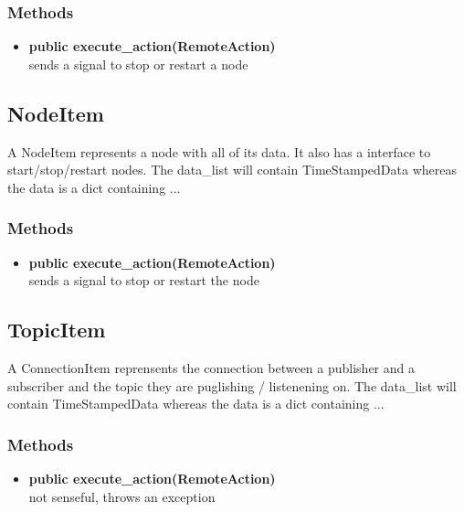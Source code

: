 \subsubsection{Methods}
\begin{itemize}
  \item \textbf{public execute\_action(RemoteAction)}\\
  sends a signal to stop or restart a node
\end{itemize}

\subsection{NodeItem}
 A NodeItem represents a node with all of its data. It also has a interface to start/stop/restart nodes.
 The data\_list will contain TimeStampedData whereas the data is a dict containing ...
\subsubsection{Methods}
\begin{itemize}
  \item \textbf{public execute\_action(RemoteAction)}\\
  sends a signal to stop or restart the node
\end{itemize}

\subsection{TopicItem}
A ConnectionItem reprensents the connection between a publisher and a subscriber and the topic they are puglishing / listenening on.
The data\_list will contain TimeStampedData whereas the data is a dict containing ...
\subsubsection{Methods}
\begin{itemize}
  \item \textbf{public execute\_action(RemoteAction)}\\ 
  not senseful, throws an exception
\end{itemize}

